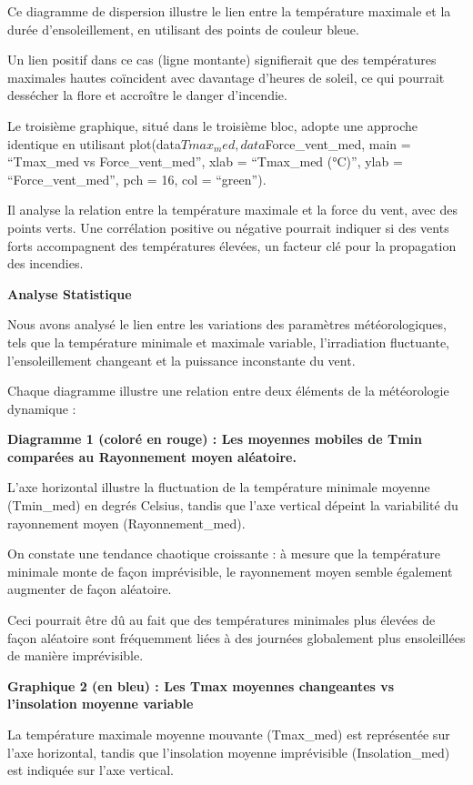 \documentclass[
]{article}
\begin{document}
Ce diagramme de dispersion illustre le lien entre la température
maximale et la durée d'ensoleillement, en utilisant des points de
couleur bleue.

Un lien positif dans ce cas (ligne montante) signifierait que des
températures maximales hautes coïncident avec davantage d'heures de
soleil, ce qui pourrait dessécher la flore et accroître le danger
d'incendie.

Le troisième graphique, situé dans le troisième bloc, adopte une
approche identique en utilisant
plot(data\(Tmax_med, data\)Force\_vent\_med, main = ``Tmax\_med vs
Force\_vent\_med'', xlab = ``Tmax\_med (°C)'', ylab =
``Force\_vent\_med'', pch = 16, col = ``green'').

Il analyse la relation entre la température maximale et la force du
vent, avec des points verts. Une corrélation positive ou négative
pourrait indiquer si des vents forts accompagnent des températures
élevées, un facteur clé pour la propagation des incendies.

\textbf{Analyse Statistique}

Nous avons analysé le lien entre les variations des paramètres
météorologiques, tels que la température minimale et maximale variable,
l'irradiation fluctuante, l'ensoleillement changeant et la puissance
inconstante du vent.

Chaque diagramme illustre une relation entre deux éléments de la
météorologie dynamique :

\textbf{Diagramme 1 (coloré en rouge) : Les moyennes mobiles de Tmin
comparées au Rayonnement moyen aléatoire.}

L'axe horizontal illustre la fluctuation de la température minimale
moyenne (Tmin\_med) en degrés Celsius, tandis que l'axe vertical dépeint
la variabilité du rayonnement moyen (Rayonnement\_med).

On constate une tendance chaotique croissante : à mesure que la
température minimale monte de façon imprévisible, le rayonnement moyen
semble également augmenter de façon aléatoire.

Ceci pourrait être dû au fait que des températures minimales plus
élevées de façon aléatoire sont fréquemment liées à des journées
globalement plus ensoleillées de manière imprévisible.

\textbf{Graphique 2 (en bleu) : Les Tmax moyennes changeantes vs
l'insolation moyenne variable}

La température maximale moyenne mouvante (Tmax\_med) est représentée sur
l'axe horizontal, tandis que l'insolation moyenne imprévisible
(Insolation\_med) est indiquée sur l'axe vertical.
\end{document}
